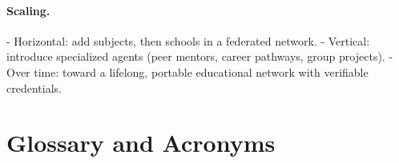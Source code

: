 \documentclass[12pt,a4paper]{article}
\begin{document}
\paragraph{Scaling.}
- Horizontal: add subjects, then schools in a federated network.
- Vertical: introduce specialized agents (peer mentors, career pathways, group projects).
- Over time: toward a lifelong, portable educational network with verifiable credentials.

\section{Glossary and Acronyms}
\glsaddall
\printglossary[title={Glossary},toctitle={Glossary}]
\printglossary[type=\acronymtype,title={Acronyms},toctitle={Acronyms}]

\printbibliography[heading=bibintoc,title={References}]
\end{document}
